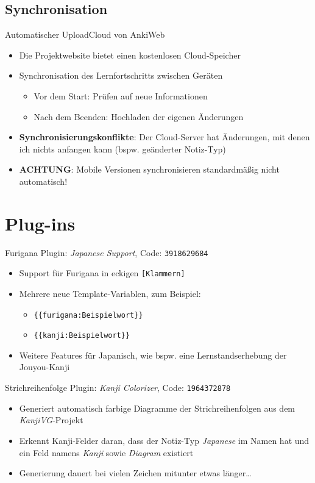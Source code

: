 \documentclass[aspectratio=169,compress]{beamer}
\begin{document}
\subsection{Synchronisation}

\begin{frame}{Automatischer Upload}{Cloud von AnkiWeb}
	\begin{itemize}
		\item Die Projektwebsite bietet einen kostenlosen Cloud-Speicher
		\item Synchronisation des Lernfortschritts zwischen Geräten
		\begin{itemize}
			\item Vor dem Start: Prüfen auf neue Informationen
			\item Nach dem Beenden: Hochladen der eigenen Änderungen
		\end{itemize}
		\item \textbf{Synchronisierungskonflikte}: Der Cloud-Server hat Änderungen, mit denen ich nichts anfangen kann (bspw. geänderter Notiz-Typ)
		\item \textbf{ACHTUNG}: Mobile Versionen synchronisieren standardmäßig nicht automatisch!
	\end{itemize}
\end{frame}

\section{Plug-ins}

\begin{frame}{Furigana}
	Plugin: \textit{Japanese Support}, Code: \texttt{3918629684}
	\begin{itemize}
		\item Support für Furigana in eckigen \texttt{[Klammern]}
		\item Mehrere neue Template-Variablen, zum Beispiel:
		\begin{itemize}
			\item \texttt{\{\{furigana:Beispielwort\}\}}
			\item \texttt{\{\{kanji:Beispielwort\}\}}
		\end{itemize}
		\item Weitere Features für Japanisch, wie bspw. eine Lernstandserhebung der Jouyou-Kanji
	\end{itemize}
\end{frame}

\begin{frame}{Strichreihenfolge}
	Plugin: \textit{Kanji Colorizer}, Code: \texttt{1964372878}
	\begin{itemize}
		\item Generiert automatisch farbige Diagramme der Strichreihenfolgen aus dem \textit{KanjiVG}-Projekt
		\item Erkennt Kanji-Felder daran, dass der Notiz-Typ \textit{Japanese} im Namen hat und ein Feld namens \textit{Kanji} sowie \textit{Diagram} existiert
		\item Generierung dauert bei vielen Zeichen mitunter etwas länger…
	\end{itemize}
\end{frame}
\end{document}

